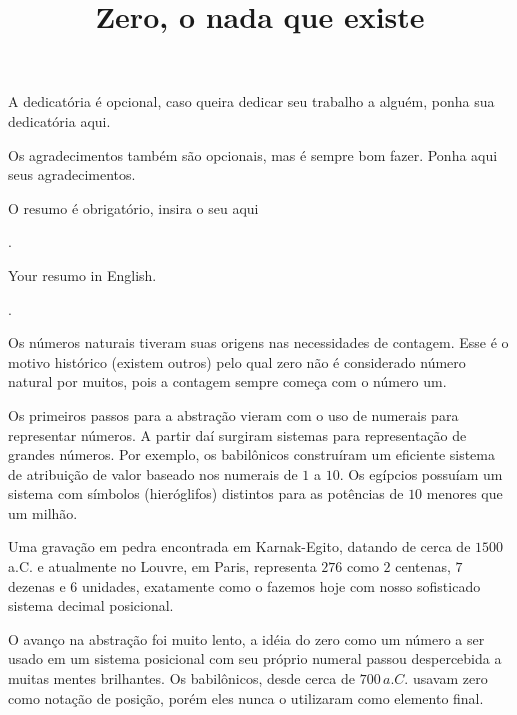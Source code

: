 \documentclass[glenn,refnum,codigo]{Estilo}
\title{Zero, o nada que existe}
\begin{document}
\frontmatter %
\capa  %
\rosto %

\begin{dedico}
	A dedicatória é opcional, caso queira dedicar seu trabalho a alguém, ponha sua dedicatória aqui.
\end{dedico}

\begin{agradece}
	Os agradecimentos também são opcionais, mas é sempre bom fazer. Ponha aqui seus agradecimentos.
\end{agradece}

\begin{resumo}
	
	O resumo é obrigatório, insira o seu aqui
	
	.
\end{resumo}

\begin{resumoE}
	
	Your resumo in English.
	
	.
\end{resumoE}

\tableofcontents    %
\introducao

Os números naturais tiveram suas origens nas necessidades de contagem.
Esse é o motivo histórico (existem outros) pelo qual zero não é considerado
número natural por muitos, pois a contagem sempre começa com o número um.

Os primeiros passos para a abstração vieram com o uso de numerais para
representar números. A partir daí surgiram sistemas para representação
de grandes números. Por exemplo, os babilônicos construíram um eficiente
sistema de atribuição de valor baseado nos numerais de $1$ a $10$. Os
egípcios possuíam um sistema com símbolos (hieróglifos) distintos para
as potências de $10$ menores que um milhão.

Uma gravação em pedra encontrada em Karnak-Egito, datando de cerca
de $1500$ a.C. e atualmente no Louvre, em Paris, representa $276$
como $2$ centenas, $7$ dezenas e $6$ unidades, exatamente como o fazemos
hoje com nosso sofisticado sistema decimal posicional.

O avanço na abstração foi muito lento, a idéia do zero como um número
a ser usado em um sistema posicional com seu próprio numeral passou
despercebida a muitas mentes brilhantes. Os babilônicos, desde cerca
de $700\, a.C.$ usavam zero como notação de posição, porém eles nunca
o utilizaram como elemento final.
\end{document}
